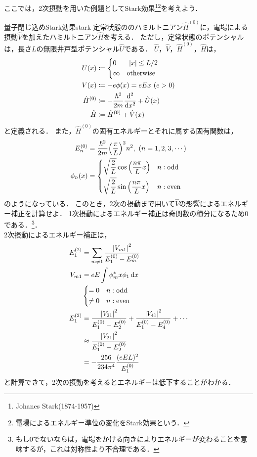 \documentclass{report}
\begin{document}
  ここでは，2次摂動を用いた例題としてStark効果\footnote{Johanes Stark(1874-1957)}\footnote{電場によるエネルギー準位の変化をStark効果という．}を考えよう．
  \begin{myex}{量子閉じ込めStark効果}{stark}
    定常状態ののハミルトニアン$\hat{H}^{(0)}$に，電場による摂動$\hat{V}$を加えたハミルトニアン$\hat{H}$を考える．
    ただし，定常状態のポテンシャルは，長さ$L$の無限井戸型ポテンシャル$\hat{U}$である．
    $\hat{U}$，$\hat{V}$，$\hat{H}^{(0)}$，$\hat{H}$は，
    \begin{align}
      U(x) &\coloneqq
      \begin{dcases}
        0 & \ \abs{x}\leq L/2\\
        \infty & \text{otherwise}
      \end{dcases} \\ 
      V(x) &\coloneqq -e\phi(x) = eEx\ (e>0) \\ 
      \hat{H}^{(0)} &\coloneqq -\frac{\hbar^2}{2m}\dv[2]{x} + \hat{U}(x) \\ 
      \hat{H} &\coloneqq \hat{H}^{(0)} + \hat{V}(x) \\ 
    \end{align}
    と定義される．
    また，$\hat{H}^{(0)}$の固有エネルギーとそれに属する固有関数は，
    \begin{align}
      E_n^{(0)} &= \frac{\hbar^2}{2m}\qty(\frac{\pi}{L})^2n^2,\ (n = 1, 2, 3,\cdots)\\
      \phi_n(x)&=
      \begin{dcases}
        \sqrt{\frac{2}{L}}\cos\qty(\frac{n\pi}{L}x) & n: \mathrm{odd}\\
        \sqrt{\frac{2}{L}}\sin\qty(\frac{n\pi}{L}x) & n: \mathrm{even}
      \end{dcases}
    \end{align}
    のようになっている．
    このとき，2次の摂動まで用いて$\hat{V}$の影響によるエネルギー補正を計算せよ．
    \tcblower
    1次摂動によるエネルギー補正は奇関数の積分になるため0である．\footnote{もし0でないならば，電場をかける向きによりエネルギーが変わることを意味するが，これは対称性より不合理である．}．\\
    2次摂動によるエネルギー補正は，
    \begin{align}
      E_{1}^{(2)} &= \sum_{m\neq 1}\frac{\abs{V_{m1}}^2}{E_1^{(0)} - E_m^{(0)}}\\
      V_{m1} &= eE\int\phi_m^*x\phi_{1}\dd{x}\\
      &
      \begin{dcases}
      = 0 & n: \mathrm{odd}\\
      \neq 0 & n: \mathrm{even}
      \end{dcases}\\
      E_{1}^{(2)}&=\frac{\abs{V_{21}}^2}{E_1^{(0)} - E_2^{(0)}} + \frac{\abs{V_{41}}^2}{E_1^{(0)} - E_4^{(0)}} + \cdots\\
      &\approx \frac{\abs{V_{21}}^2}{E_1^{(0)} - E_2^{(0)}}\\
      &=-\frac{256}{234\pi^4}\frac{(eEL)^2}{E_1^{(0)}}
    \end{align}
    と計算できて，2次の摂動を考えるとエネルギーは低下することがわかる．
  \end{myex}
\end{document}
